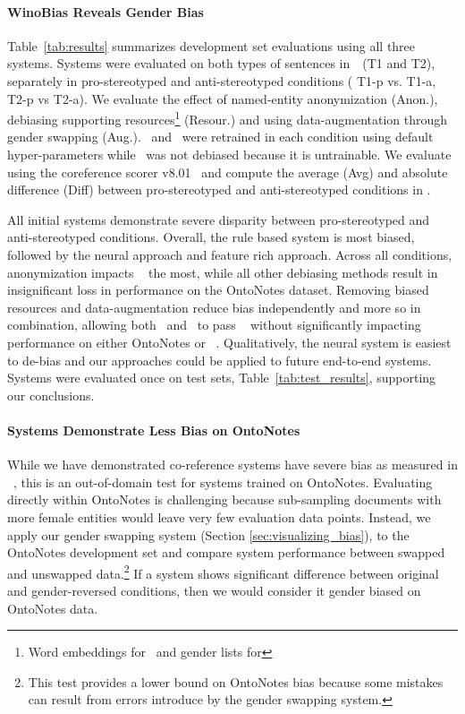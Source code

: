 \paragraph{WinoBias Reveals Gender Bias}
Table~\ref{tab:results} summarizes development set evaluations using all three systems.
Systems were evaluated on both types of sentences in~\dataset~(T1 and T2), separately in pro-stereotyped and anti-stereotyped conditions ( T1-p vs. T1-a, T2-p vs T2-a).
We evaluate the effect of named-entity anonymization (Anon.), debiasing supporting resources\footnote{Word embeddings for \UW~and gender lists for \Berkeley} (Resour.) and using data-augmentation through gender swapping (Aug.).
\UW~and \Berkeley~were retrained in each condition using default hyper-parameters while \Stanford~was not debiased because it is untrainable. 
We evaluate using the coreference scorer v8.01~\cite{pradhan2014scoring} and compute the average (Avg) and absolute difference (Diff) between pro-stereotyped and anti-stereotyped conditions in \dataset.

All initial systems demonstrate severe disparity between pro-stereotyped and anti-stereotyped conditions. 
Overall, the rule based system is most biased, followed by the neural approach and feature rich approach. 
Across all conditions, anonymization impacts \UW~ the most, while all other debiasing methods result in insignificant loss in performance on the OntoNotes dataset.
Removing biased resources and data-augmentation reduce bias independently and more so in combination, allowing both \UW~and \Berkeley~to pass \dataset~ without significantly impacting performance on either OntoNotes or \dataset~. 
Qualitatively, the neural system is easiest to de-bias and %
our approaches could be applied to future end-to-end systems.
Systems were evaluated once on test sets, Table~\ref{tab:test_results}, supporting our conclusions.

\paragraph{Systems Demonstrate Less Bias on OntoNotes} 
While we have demonstrated co-reference systems have severe bias as measured in \dataset~, this is an out-of-domain test for systems trained on OntoNotes.
Evaluating directly within OntoNotes is challenging because sub-sampling documents with more female entities would leave very few evaluation data points.
Instead, we apply our gender swapping system (Section \ref{sec:visualizing_bias}), to the OntoNotes development set and compare system performance between swapped and unswapped data.\footnote{This test provides a lower bound on OntoNotes bias because some mistakes can result from errors introduce by the gender swapping system.}
If a system shows significant difference between original and gender-reversed conditions, then we would consider it gender biased on OntoNotes data.

